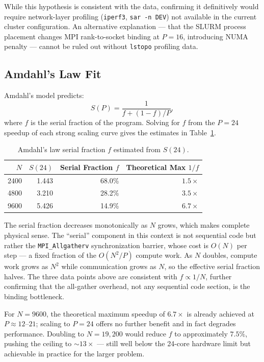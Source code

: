 \documentclass[11pt]{article}
\begin{document}
While this hypothesis is consistent with the data, confirming it definitively would require network-layer profiling (\texttt{iperf3}, \texttt{sar -n DEV}) not available in the current cluster configuration. An alternative explanation — that the SLURM process placement changes MPI rank-to-socket binding at $P = 16$, introducing NUMA penalty — cannot be ruled out without \texttt{lstopo} profiling data.

\subsection{Amdahl's Law Fit}

Amdahl's model predicts:
\begin{equation}
  S(P) = \frac{1}{f + (1-f)/P},
\end{equation}
where $f$ is the serial fraction of the program. Solving for $f$ from the $P = 24$ speedup of each strong scaling curve gives the estimates in Table~\ref{tab:amdahl}.

\begin{table}[H]
  \centering
  \caption{Amdahl's law serial fraction $f$ estimated from $S(24)$.}
  \label{tab:amdahl}
  \begin{tabular}{r r r r}
    \toprule
    $N$ & $S(24)$ & Serial Fraction $f$ & Theoretical Max $1/f$ \\
    \midrule
    2400 & 1.443 & 68.0\% & $1.5\times$ \\
    4800 & 3.210 & 28.2\% & $3.5\times$ \\
    9600 & 5.426 & 14.9\% & $6.7\times$ \\
    \bottomrule
  \end{tabular}
\end{table}

The serial fraction decreases monotonically as $N$ grows, which makes complete physical sense. The ``serial'' component in this context is not sequential code but rather the \texttt{MPI\_Allgatherv} synchronization barrier, whose cost is $O(N)$ per step — a fixed fraction of the $O(N^2/P)$ compute work. As $N$ doubles, compute work grows as $N^2$ while communication grows as $N$, so the effective serial fraction halves. The three data points above are consistent with $f \propto 1/N$, further confirming that the all-gather overhead, not any sequential code section, is the binding bottleneck.

For $N = 9600$, the theoretical maximum speedup of $6.7\times$ is already achieved at $P \approx 12$--$21$; scaling to $P = 24$ offers no further benefit and in fact degrades performance. Doubling to $N = 19{,}200$ would reduce $f$ to approximately $7.5\%$, pushing the ceiling to $\sim 13\times$ — still well below the 24-core hardware limit but achievable in practice for the larger problem.
\end{document}
